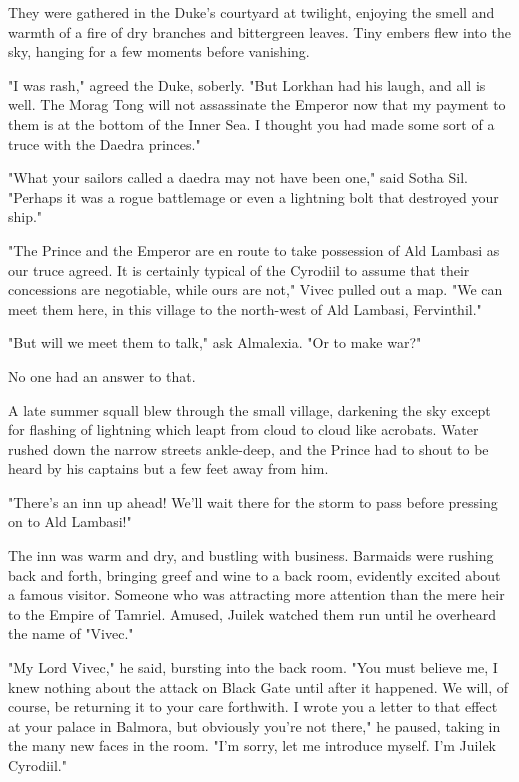\clearpage
{}

\dropcap They were gathered in the Duke's courtyard at twilight, enjoying the smell and warmth of a fire of dry branches and bittergreen leaves. Tiny embers flew into the sky, hanging for a few moments before vanishing.

"I was rash," agreed the Duke, soberly. "But Lorkhan had his laugh, and all is well. The Morag Tong will not assassinate the Emperor now that my payment to them is at the bottom of the Inner Sea. I thought you had made some sort of a truce with the Daedra princes."

"What your sailors called a daedra may not have been one," said Sotha Sil. "Perhaps it was a rogue battlemage or even a lightning bolt that destroyed your ship."

"The Prince and the Emperor are en route to take possession of Ald Lambasi as our truce agreed. It is certainly typical of the Cyrodiil to assume that their concessions are negotiable, while ours are not," Vivec pulled out a map. "We can meet them here, in this village to the north-west of Ald Lambasi, Fervinthil."

"But will we meet them to talk," ask Almalexia. "Or to make war?"

No one had an answer to that.

A late summer squall blew through the small village, darkening the sky except for flashing of lightning which leapt from cloud to cloud like acrobats. Water rushed down the narrow streets ankle-deep, and the Prince had to shout to be heard by his captains but a few feet away from him.

"There's an inn up ahead! We'll wait there for the storm to pass before pressing on to Ald Lambasi!"

The inn was warm and dry, and bustling with business. Barmaids were rushing back and forth, bringing greef and wine to a back room, evidently excited about a famous visitor. Someone who was attracting more attention than the mere heir to the Empire of Tamriel. Amused, Juilek watched them run until he overheard the name of "Vivec."

"My Lord Vivec," he said, bursting into the back room. "You must believe me, I knew nothing about the attack on Black Gate until after it happened. We will, of course, be returning it to your care forthwith. I wrote you a letter to that effect at your palace in Balmora, but obviously you're not there," he paused, taking in the many new faces in the room. "I'm sorry, let me introduce myself. I'm Juilek Cyrodiil."

